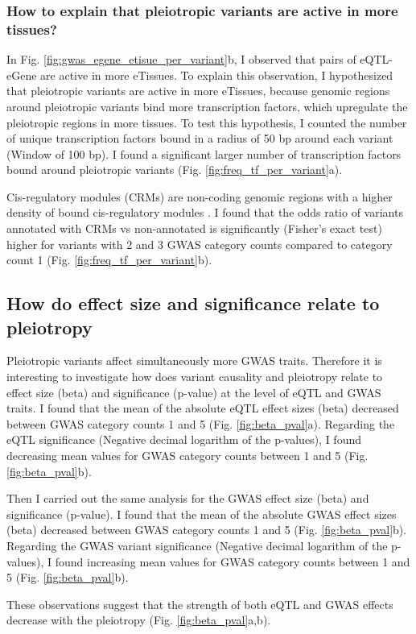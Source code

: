 \subsubsection*{How to explain that pleiotropic variants are active in more tissues?}

In Fig. \ref{fig:gwas_egene_etisue_per_variant}b, I observed that pairs of eQTL-eGene are active in more eTissues.
%
To explain this observation, I hypothesized that pleiotropic variants are active in more eTissues, because genomic regions around pleiotropic variants bind more transcription factors, which upregulate the pleiotropic regions in more tissues.
%
To test this hypothesis, I counted the number of unique transcription factors bound in a radius of 50 bp around each variant (Window of 100 bp).
%
I found a significant larger number of transcription factors bound around pleiotropic variants (Fig. \ref{fig:freq_tf_per_variant}a).

Cis-regulatory modules (CRMs) are non-coding genomic regions with a higher density of bound cis-regulatory modules \citep{2021.Ballester.Hammal}.
%
I found that the odds ratio of variants annotated with CRMs vs non-annotated is significantly (Fisher's exact test) higher for variants with 2 and 3 GWAS category counts compared to category count 1 (Fig. \ref{fig:freq_tf_per_variant}b).

\subsection*{How do effect size and significance relate to pleiotropy}

Pleiotropic variants affect simultaneously more GWAS traits.
%
Therefore it is interesting to investigate how does variant causality and pleiotropy relate to effect size (beta) and significance (p-value) at the level of eQTL and GWAS traits.
%
I found that the mean of the absolute eQTL effect sizes (beta) decreased between GWAS category counts 1 and 5 (Fig. \ref{fig:beta_pval}a).
%
Regarding the eQTL significance (Negative decimal logarithm of the p-values), I found decreasing mean values for GWAS category counts between 1 and 5 (Fig. \ref{fig:beta_pval}b).

Then I carried out the same analysis for the GWAS effect size (beta) and significance (p-value).
%
I found that the mean of the absolute GWAS effect sizes (beta) decreased between GWAS category counts 1 and 5 (Fig. \ref{fig:beta_pval}b).
%
Regarding the GWAS variant significance (Negative decimal logarithm of the p-values), I found increasing mean values for GWAS category counts between 1 and 5 (Fig. \ref{fig:beta_pval}b).

These observations suggest that the strength of both eQTL and GWAS effects decrease with the pleiotropy (Fig. \ref{fig:beta_pval}a,b).
